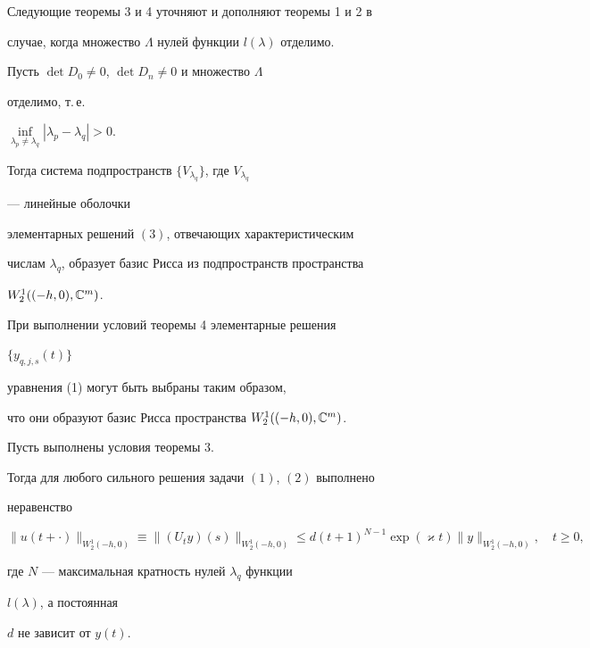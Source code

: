  


Следующие теоремы 3 и 4 уточняют и дополняют теоремы 1 и 2 в 


случае, когда множество $\Lambda$ нулей функции $l(\lambda)$ отделимо. 


 


\begin{thm} 


Пусть $\det D_0\ne0$, $\det D_n\ne0$ и множество $\Lambda$ 


отделимо, т.\,е. 


$\inf\limits_{\lambda_p\ne\lambda_q}|\lambda_p-\lambda_q|>0$. 


Тогда система подпространств $\{V_{\lambda_q}\}$, где $V_{\lambda_q}$ 


--- линейные оболочки 


элементарных решений $(3)$, отвечающих характеристическим 


числам $\lambda_q$, образует базис Рисса из подпространств пространства 


$W^1_2((-h,0),\Bbb C^m)$. 


\end{thm} 


 


\begin{cornonum} 


При выполнении условий теоремы 4 элементарные решения 


$\{y_{q,j,s}(t)\}$ 


уравнения (1) могут быть выбраны таким образом, 


что они образуют базис Рисса пространства $W^1_2((-h,0),\Bbb C^m)$. 


\end{cornonum} 


 


\begin{thm} 


Пусть выполнены условия теоремы $3$. 


Тогда для любого сильного решения задачи $(1)$, $(2)$ выполнено 


неравенство 


\begin{equation} 


\|u(t+\cdot)\|_{W^1_2(-h,0)}\equiv 


\|(U_t y)(s)\|_{W^1_2(-h,0)}\le d(t+1)^{N-1} 


\exp(\varkappa t)\|y\|_{W^1_2(-h,0)},\quad t\ge0, 


\end{equation} 


где $N$ --- максимальная кратность нулей $\lambda_q$ функции 


$l(\lambda)$, а постоянная 


$d$ не зависит от $y(t)$. 


\end{thm} 


